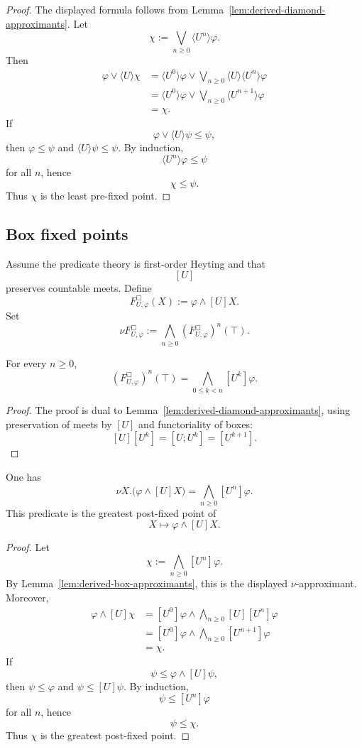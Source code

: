\begin{proof}
The displayed formula follows from
Lemma~\ref{lem:derived-diamond-approximants}. Let
\[
\chi:=
\bigvee_{n\ge0}\langle U^n\rangle\varphi.
\]
Then
\[
\begin{aligned}
\varphi\vee\langle U\rangle\chi
&=
\langle U^0\rangle\varphi
\vee
\bigvee_{n\ge0}\langle U\rangle\langle U^n\rangle\varphi
\\
&=
\langle U^0\rangle\varphi
\vee
\bigvee_{n\ge0}\langle U^{n+1}\rangle\varphi
\\
&=
\chi.
\end{aligned}
\]
If
\[
\varphi\vee\langle U\rangle\psi\le\psi,
\]
then \(\varphi\le\psi\) and \(\langle U\rangle\psi\le\psi\). By induction,
\[
\langle U^n\rangle\varphi\le\psi
\]
for all \(n\), hence
\[
\chi\le\psi.
\]
Thus \(\chi\) is the least pre-fixed point.
\end{proof}

\subsection{Box fixed points}
\label{subsec:derived-box-fixed-points}

Assume the predicate theory is first-order Heyting and that
\[
[U]
\]
preserves countable meets. Define
\[
F^\Box_{U,\varphi}(X)
:=
\varphi\wedge[U]X.
\]
Set
\[
\nu F^\Box_{U,\varphi}
:=
\bigwedge_{n\ge0}(F^\Box_{U,\varphi})^n(\top).
\]

\begin{lemma}
\label{lem:derived-box-approximants}
For every \(n\ge0\),
\[
(F^\Box_{U,\varphi})^n(\top)
=
\bigwedge_{0\le k<n}[U^k]\varphi.
\]
\end{lemma}

\begin{proof}
The proof is dual to Lemma~\ref{lem:derived-diamond-approximants}, using
preservation of meets by \([U]\) and functoriality of boxes:
\[
[U][U^k]=[U;U^k]=[U^{k+1}].
\]
\end{proof}

\begin{theorem}
\label{thm:derived-box-gfp}
One has
\[
\nu X.\bigl(\varphi\wedge[U]X\bigr)
=
\bigwedge_{n\ge0}[U^n]\varphi.
\]
This predicate is the greatest post-fixed point of
\[
X\longmapsto \varphi\wedge[U]X.
\]
\end{theorem}

\begin{proof}
Let
\[
\chi:=
\bigwedge_{n\ge0}[U^n]\varphi.
\]
By Lemma~\ref{lem:derived-box-approximants}, this is the displayed
\(\nu\)-approximant. Moreover,
\[
\begin{aligned}
\varphi\wedge[U]\chi
&=
[U^0]\varphi
\wedge
\bigwedge_{n\ge0}[U][U^n]\varphi
\\
&=
[U^0]\varphi
\wedge
\bigwedge_{n\ge0}[U^{n+1}]\varphi
\\
&=
\chi.
\end{aligned}
\]
If
\[
\psi\le \varphi\wedge[U]\psi,
\]
then \(\psi\le\varphi\) and \(\psi\le[U]\psi\). By induction,
\[
\psi\le[U^n]\varphi
\]
for all \(n\), hence
\[
\psi\le\chi.
\]
Thus \(\chi\) is the greatest post-fixed point.
\end{proof}

